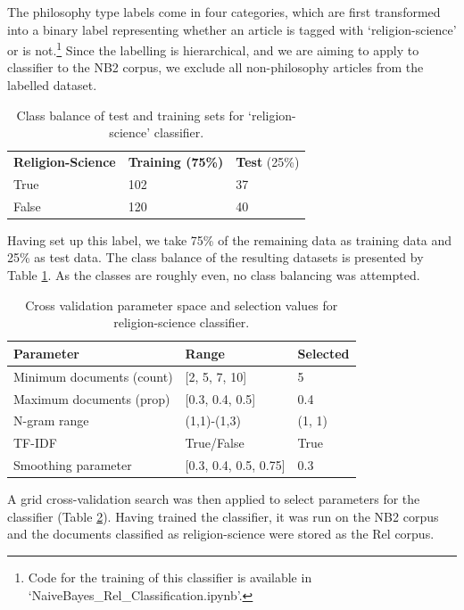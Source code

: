 \documentclass{article}
\begin{document}
The philosophy type labels come in four categories, which are first transformed into a binary label representing whether an article is tagged with `religion-science' or is not.\footnote{Code for the training of this classifier is available in `NaiveBayes\_\-Rel\_\-Classification.ipynb'.} Since the labelling is hierarchical, and we are aiming to apply to classifier to the NB2 corpus, we exclude all non-philosophy articles from the labelled dataset.

\begin{table}
  \centering
  \begin{tabular}{l|ll}
    \textbf{Religion-Science} & \textbf{Training (75\%)} & \textbf{Test} (25\%)\\
    True & 102 & 37 \\
    False & 120 & 40 \\
  \end{tabular}
  \caption{Class balance of test and training sets for `religion-science' classifier.}
  \label{t:rel-nbc-classes}
\end{table}

Having set up this label, we take 75\% of the remaining data as training data and 25\% as test data. The class balance of the resulting datasets is presented by Table \ref{t:rel-nbc-classes}. As the classes are roughly even, no class balancing was attempted.

\begin{table}[]
  \centering
  \footnotesize
  \begin{tabular}{l|ll}
      Parameter & Range & Selected \\
      \hline
      Minimum documents (count) & [2, 5, 7, 10] &  5 \\
      Maximum documents (prop) & [0.3, 0.4, 0.5] & 0.4 \\
      N-gram range & (1,1)-(1,3) & (1, 1) \\
      TF-IDF & True/False & True \\
      Smoothing parameter & [0.3, 0.4, 0.5, 0.75] & 0.3 \\
  \end{tabular}
  \caption{Cross validation parameter space and selection values for religion-science classifier.}
  \label{t:CV-relsci}
\end{table}

A grid cross-validation search was then applied to select parameters for the classifier (Table \ref{t:CV-relsci}). Having trained the classifier, it was run on the NB2 corpus and the documents classified as religion-science were stored as the Rel corpus.
\end{document}
